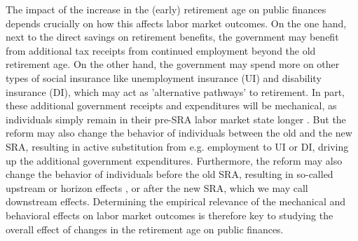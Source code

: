 \documentclass[12pt,a4paper]{article}
\begin{document}
The impact of the increase in the (early) retirement age on public finances depends crucially on how this affects labor market outcomes. On the one hand, next to the direct savings on retirement benefits, the government may benefit from additional tax receipts from continued employment beyond the old retirement age. On the other hand, the government may spend more on other types of social insurance like unemployment insurance (UI) and disability insurance (DI), which may act as 'alternative pathways' to retirement. In part, these additional government receipts and expenditures will be mechanical, as individuals simply remain in their pre-SRA labor market state longer \citep{staubli_does_2013,manoli_effects_2018,oguzoglu_et_al_2020,geyer_closing_2021}. But the reform may also change the behavior of individuals between the old and the new SRA, resulting in active substitution from e.g. employment to UI or DI, driving up the additional government expenditures. Furthermore, the reform may also change the behavior of individuals before the old SRA, resulting in so-called upstream or horizon effects \citep{hairault_distance_2010,jacobs_2010}, or after the new SRA, which we may call downstream effects.    
Determining the empirical relevance of the mechanical and behavioral effects on labor market outcomes is therefore key to studying the overall effect of changes in the retirement age on public finances. 

\end{document}
